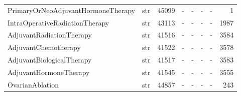 \begin{tabular}{lllllllr}
PrimaryOrNeoAdjuvantHormoneTherapy & str & 45099 & - & - & - & - & 1 \\
IntraOperativeRadiationTherapy & str & 43113 & - & - & - & - & 1987 \\
AdjuvantRadiationTherapy & str & 41516 & - & - & - & - & 3584 \\
AdjuvantChemotherapy & str & 41522 & - & - & - & - & 3578 \\
AdjuvantBiologicalTherapy & str & 41517 & - & - & - & - & 3583 \\
AdjuvantHormoneTherapy & str & 41545 & - & - & - & - & 3555 \\
OvarianAblation & str & 44857 & - & - & - & - & 243 \\
\bottomrule
\end{tabular}
